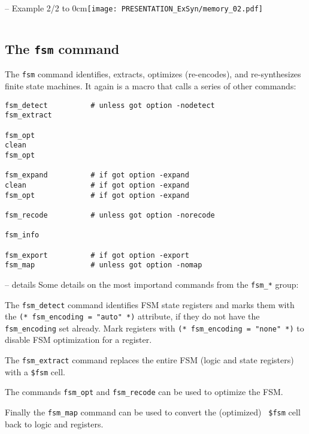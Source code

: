 \begin{frame}[t, fragile]{\subsecname{} -- Example 2/2}
\vbox to 0cm{\hfill\texttt{[image: PRESENTATION\_ExSyn/memory\_02.pdf]}\vss}
\vskip-1cm
\begin{columns}
\column[t]{5cm}

\column[t]{5cm}

\end{columns}
\end{frame}


\subsection{The {\tt fsm} command}

\begin{frame}[fragile]{\subsecname{}}
The {\tt fsm} command identifies, extracts, optimizes (re-encodes), and
re-synthesizes finite state machines. It again is a macro that calls
a series of other commands:

\begin{lstlisting}[xleftmargin=0.5cm, basicstyle=\ttfamily\fontsize{8pt}{10pt}\selectfont, language=ys]
fsm_detect          # unless got option -nodetect
fsm_extract

fsm_opt
clean
fsm_opt

fsm_expand          # if got option -expand
clean               # if got option -expand
fsm_opt             # if got option -expand

fsm_recode          # unless got option -norecode

fsm_info

fsm_export          # if got option -export
fsm_map             # unless got option -nomap
\end{lstlisting}
\end{frame}

\begin{frame}{\subsecname{} -- details}
Some details on the most importand commands from the {\tt fsm\_*} group:

\bigskip
The {\tt fsm\_detect} command identifies FSM state registers and marks them
with the {\tt (* fsm\_encoding = "auto" *)} attribute, if they do not have the
{\tt fsm\_encoding} set already. Mark registers with {\tt (* fsm\_encoding =
"none" *)} to disable FSM optimization for a register.

\bigskip
The {\tt fsm\_extract} command replaces the entire FSM (logic and state
registers) with a {\tt \$fsm} cell.

\bigskip
The commands {\tt fsm\_opt} and {\tt fsm\_recode} can be used to optimize the
FSM.

\bigskip
Finally the {\tt fsm\_map} command can be used to convert the (optimized) {\tt
\$fsm} cell back to logic and registers.
\end{frame}

